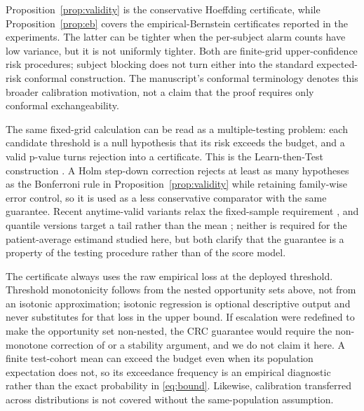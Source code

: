 Proposition~\ref{prop:validity} is the conservative Hoeffding certificate, while Proposition~\ref{prop:eb} covers the empirical-Bernstein certificates reported in the experiments. The latter can be tighter when the per-subject alarm counts have low variance, but it is not uniformly tighter. Both are finite-grid upper-confidence risk procedures; subject blocking does not turn either into the standard expected-risk conformal construction. The manuscript's conformal terminology denotes this broader calibration motivation, not a claim that the proof requires only conformal exchangeability.

The same fixed-grid calculation can be read as a multiple-testing problem: each candidate threshold is a null hypothesis that its risk exceeds the budget, and a valid p-value turns rejection into a certificate. This is the Learn-then-Test construction \citep{angelopoulos2021learn}. A Holm step-down correction rejects at least as many hypotheses as the Bonferroni rule in Proposition~\ref{prop:validity} while retaining family-wise error control, so it is used as a less conservative comparator with the same guarantee. Recent anytime-valid variants relax the fixed-sample requirement \citep{hultberg2026anytimevalid}, and quantile versions target a tail rather than the mean \citep{farzaneh2024quantile}; neither is required for the patient-average estimand studied here, but both clarify that the guarantee is a property of the testing procedure rather than of the score model.

The certificate always uses the raw empirical loss at the deployed threshold. Threshold monotonicity follows from the nested opportunity sets above, not from an isotonic approximation; isotonic regression is optional descriptive output and never substitutes for that loss in the upper bound. If escalation were redefined to make the opportunity set non-nested, the CRC guarantee would require the non-monotone correction of \cite{angelopoulos2026conformal} or a stability argument, and we do not claim it here. A finite test-cohort mean can exceed the budget even when its population expectation does not, so its exceedance frequency is an empirical diagnostic rather than the exact probability in \cref{eq:bound}. Likewise, calibration transferred across distributions is not covered without the same-population assumption.
